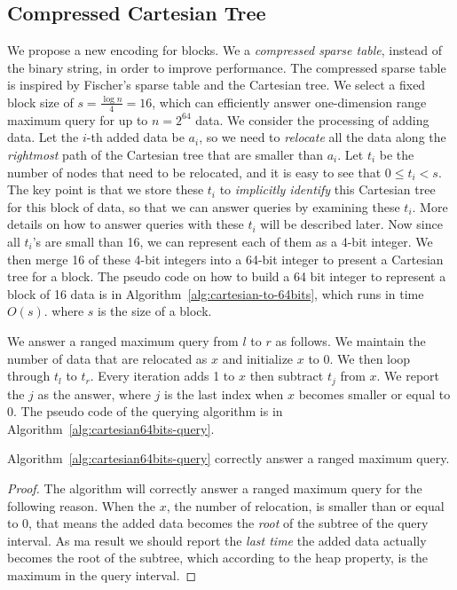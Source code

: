 \subsection{Compressed Cartesian Tree}

We propose a new encoding for blocks.  We a {\em compressed sparse
  table}, instead of the binary string, in order to improve
performance.  The compressed sparse table is inspired by Fischer's
sparse table and the Cartesian tree.  We select a fixed block size of
$s = {{\frac{\log n}{4}}} = 16$, which can efficiently answer
one-dimension range maximum query for up to $n = 2^{64}$ data.  We
consider the processing of adding data.  Let the $i$-th added data be
$a_i$, so we need to {\em relocate} all the data along the {\em
  rightmost} path of the Cartesian tree that are smaller than $a_i$.
Let $t_i$ be the number of nodes that need to be relocated, and it
is easy to see that $0 \le t_i < s$.  The key point is that we store
these $t_i$ to {\em implicitly identify} this Cartesian tree for this
block of data, so that we can answer queries by examining these $t_i$.
More details on how to answer queries with these $t_i$ will be
described later.  Now since all $t_i$'s are small than 16, we can
represent each of them as a 4-bit integer.  We then merge 16 of these
4-bit integers into a 64-bit integer to present a Cartesian tree for a
block.  The pseudo code on how to build a 64 bit integer to represent
a block of 16 data is in Algorithm~\ref{alg:cartesian-to-64bits},
which runs in time $O(s)$. where $s$ is the size of a block.



We answer a ranged maximum query from $l$ to $r$ as follows.  We
maintain the number of data that are relocated as $x$ and
initialize $x$ to 0.  We then loop through $t_l$ to $t_r$.  Every
iteration adds 1 to $x$ then subtract $t_j$ from $x$.  We report the
$j$ as the answer, where $j$ is the last index when $x$ becomes
smaller or equal to 0.  The pseudo code of the querying algorithm is
in Algorithm~\ref{alg:cartesian64bits-query}.



\begin{theorem}
  Algorithm~\ref{alg:cartesian64bits-query} correctly answer a ranged
  maximum query.
\end{theorem}
\begin{proof}
The algorithm will correctly answer a ranged maximum query for the
following reason.  When the $x$, the number of relocation, is smaller
than or equal to 0, that means the added data becomes the {\em root} of
the subtree of the query interval.  As ma result we should report the
{\em last time} the added data actually becomes the root of the
subtree, which according to the heap property, is the maximum in the
query interval.
\end{proof}

